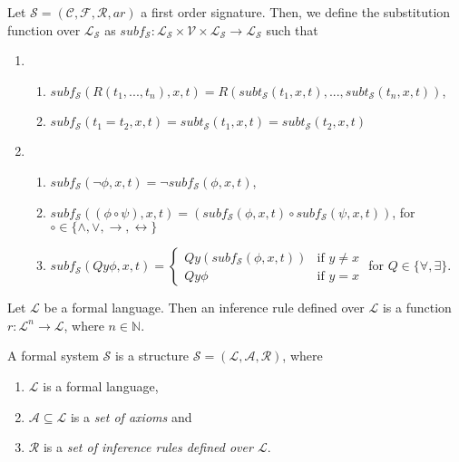 \begin{definition}\label{def:sub-f}
    Let $\mathcal{S} = (\mathcal{C},\mathcal{F},\mathcal{R},ar)$ a first order signature. Then, we define the substitution function over $\mathcal{L}_{\mathcal{S}}$ as $subf_{\mathcal{S}} : \mathcal{L}_{\mathcal{S}} \times \mathcal{V} \times \mathcal{L}_{\mathcal{S}} \to \mathcal{L}_{\mathcal{S}}$ such that
    \begin{enumerate}
        \item \begin{enumerate} 
            \item $subf_{\mathcal{S}}(R(t_1,...,t_n),x,t) = R(subt_{\mathcal{S}}(t_1,x,t),...,subt_{\mathcal{S}}(t_n,x,t))$,
            \item $subf_{\mathcal{S}}(t_1 = t_2,x,t) = subt_{\mathcal{S}}(t_1,x,t) = subt_{\mathcal{S}}(t_2,x,t)$
        \end{enumerate}
        \item \begin{enumerate}
            \item $subf_{\mathcal{S}}(\neg \phi,x,t) = \neg subf_{\mathcal{S}}(\phi,x,t)$,
            \item $subf_{\mathcal{S}}((\phi \circ \psi),x,t) = (subf_{\mathcal{S}}(\phi,x,t) \circ subf_{\mathcal{S}}(\psi,x,t))$, for $\circ \in \{\land,\lor,\to,\leftrightarrow\}$ 
            \item $subf_{\mathcal{S}}(Qy\phi,x,t)= \begin{cases}
                Qy(subf_{\mathcal{S}}(\phi,x,t)) &\text{if } y \not = x \\
                Qy\phi &\text{if } y = x
            \end{cases}$ for $Q \in \{\forall, \exists\}$.
        \end{enumerate}
    \end{enumerate}
\end{definition}

\begin{definition}\label{def:inf-rule}
    Let $\mathcal{L}$ be a formal language. Then an inference rule defined over $\mathcal{L}$ is a function $r : \mathcal{L}^n \to \mathcal{L}$, where $n \in \mathbb{N}$.
\end{definition}

\begin{definition}\label{def:formal-system}
    A formal system $\mathcal{S}$ is a structure $\mathcal{S} = (\mathcal{L}, \mathcal{A}, \mathcal{R})$, where 
    \begin{enumerate}
        \item $\mathcal{L}$ is a formal language,
        \item $\mathcal{A} \subseteq \mathcal{L}$ is a \textit{set of axioms} and 
        \item $\mathcal{R}$ is a \textit{set of inference rules defined over $\mathcal{L}$}.
    \end{enumerate}
\end{definition}

